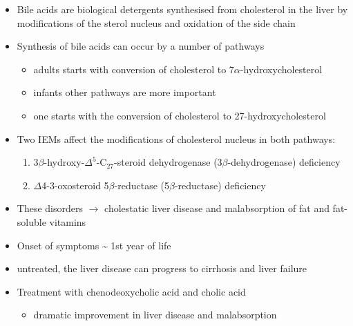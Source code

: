 \documentclass{scrartcl}
\begin{document}
\begin{itemize}
\item Bile acids are biological detergents synthesised from cholesterol
in the liver by modifications of the sterol nucleus and oxidation of
the side chain
\item Synthesis of bile acids can occur by a number of pathways
\begin{itemize}
\item adults starts with conversion of cholesterol to 7\(\alpha\)-hydroxycholesterol
\item infants other pathways are more important
\item one starts with the conversion of cholesterol to 27-hydroxycholesterol
\end{itemize}
\item Two IEMs affect the modifications of cholesterol nucleus in both pathways:
\begin{enumerate}
\item 3\(\beta\)-hydroxy-\(\Delta^{\text{5}}\)-C\(_{\text{27}}\)-steroid dehydrogenase (3\(\beta\)-dehydrogenase) deficiency
\item \(\Delta\)4-3-oxosteroid 5\(\beta\)-reductase (5\(\beta\)-reductase) deficiency
\end{enumerate}
\item These disorders \(\to\) cholestatic liver disease and malabsorption of
fat and fat-soluble vitamins
\item Onset of symptoms \textasciitilde{} 1st year of life
\item untreated, the liver disease can progress to cirrhosis and liver failure
\item Treatment with chenodeoxycholic acid and cholic acid
\begin{itemize}
\item dramatic improvement in liver disease and malabsorption
\end{itemize}


\end{itemize}
\end{document}
